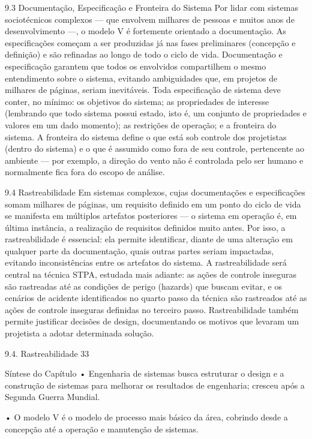 9.3 Documentação, Especificação e Fronteira do Sistema Por lidar com sistemas sociotécnicos complexos — que envolvem milhares de pessoas e muitos anos de desenvolvimento —, o modelo V é fortemente orientado a documentação. As especificações começam a ser produzidas já nas fases preliminares (concepção e definição) e são refinadas ao longo de todo o ciclo de vida. Documentação e especificação garantem que todos os envolvidos compartilhem o mesmo entendimento sobre o sistema, evitando ambiguidades que, em projetos de milhares de páginas, seriam inevitáveis. Toda especificação de sistema deve conter, no mínimo: os objetivos do sistema; as propriedades de interesse (lembrando que todo sistema possui estado, isto é, um conjunto de propriedades e valores em um dado momento); as restrições de operação; e a fronteira do sistema. A fronteira do sistema define o que está sob controle dos projetistas (dentro do sistema) e o que é assumido como fora de seu controle, pertencente ao ambiente — por exemplo, a direção do vento não é controlada pelo ser humano e normalmente fica fora do escopo de análise.

9.4 Rastreabilidade Em sistemas complexos, cujas documentações e especificações somam milhares de páginas, um requisito definido em um ponto do ciclo de vida se manifesta em múltiplos artefatos posteriores — o sistema em operação é, em última instância, a realização de requisitos definidos muito antes. Por isso, a rastreabilidade é essencial: ela permite identificar, diante de uma alteração em qualquer parte da documentação, quais outras partes seriam impactadas, evitando inconsistências entre os artefatos do sistema. A rastreabilidade será central na técnica STPA, estudada mais adiante: as ações de controle inseguras são rastreadas até as condições de perigo (hazards) que buscam evitar, e os cenários de acidente identificados no quarto passo da técnica são rastreados até as ações de controle inseguras definidas no terceiro passo. Rastreabilidade também permite justificar decisões de design, documentando os motivos que levaram um projetista a adotar determinada solução.

9.4. Rastreabilidade 33

Síntese do Capítulo • Engenharia de sistemas busca estruturar o design e a construção de sistemas para melhorar os resultados de engenharia; cresceu após a Segunda Guerra Mundial.

• O modelo V é o modelo de processo mais básico da área, cobrindo desde a concepção até a operação e manutenção de sistemas.

